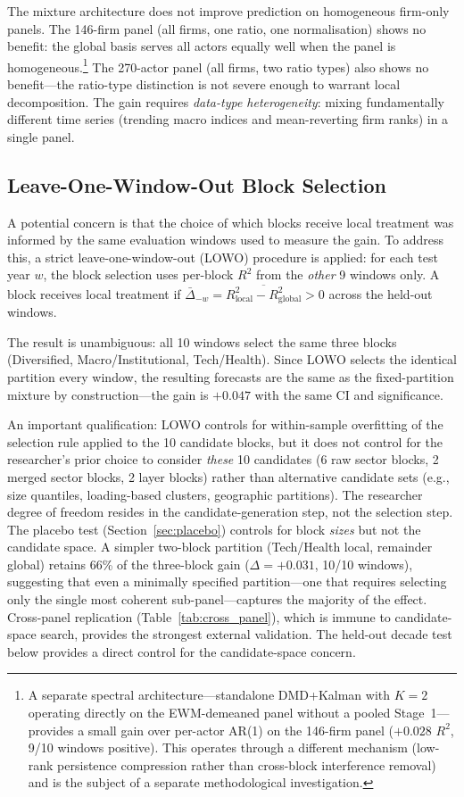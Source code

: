 \documentclass[11pt,a4paper]{article}
\begin{document}
The mixture architecture does not improve prediction on homogeneous firm-only panels. The 146-firm panel (all firms, one ratio, one normalisation) shows no benefit: the global basis serves all actors equally well when the panel is homogeneous.\footnote{A separate spectral architecture---standalone DMD+Kalman with $K{=}2$ operating directly on the EWM-demeaned panel without a pooled Stage~1---provides a small gain over per-actor AR(1) on the 146-firm panel ($+0.028$ $R^2$, 9/10 windows positive). This operates through a different mechanism (low-rank persistence compression rather than cross-block interference removal) and is the subject of a separate methodological investigation.} The 270-actor panel (all firms, two ratio types) also shows no benefit---the ratio-type distinction is not severe enough to warrant local decomposition. The gain requires \emph{data-type heterogeneity}: mixing fundamentally different time series (trending macro indices and mean-reverting firm ranks) in a single panel.

\subsection{Leave-One-Window-Out Block Selection}

A potential concern is that the choice of which blocks receive local treatment was informed by the same evaluation windows used to measure the gain. To address this, a strict leave-one-window-out (LOWO) procedure is applied: for each test year $w$, the block selection uses per-block $R^2$ from the \emph{other} 9 windows only. A block receives local treatment if $\bar\Delta_{-w} = \overline{R^2_{\text{local}} - R^2_{\text{global}}} > 0$ across the held-out windows.

The result is unambiguous: all 10 windows select the same three blocks (Diversified, Macro/Institutional, Tech/Health). Since LOWO selects the identical partition every window, the resulting forecasts are the same as the fixed-partition mixture by construction---the gain is $+0.047$ with the same CI and significance.

An important qualification: LOWO controls for within-sample overfitting of the selection rule applied to the 10 candidate blocks, but it does not control for the researcher's prior choice to consider \emph{these} 10 candidates (6 raw sector blocks, 2 merged sector blocks, 2 layer blocks) rather than alternative candidate sets (e.g., size quantiles, loading-based clusters, geographic partitions). The researcher degree of freedom resides in the candidate-generation step, not the selection step. The placebo test (Section~\ref{sec:placebo}) controls for block \emph{sizes} but not the candidate space. A simpler two-block partition (Tech/Health local, remainder global) retains 66\% of the three-block gain ($\Delta = +0.031$, 10/10 windows), suggesting that even a minimally specified partition---one that requires selecting only the single most coherent sub-panel---captures the majority of the effect. Cross-panel replication (Table~\ref{tab:cross_panel}), which is immune to candidate-space search, provides the strongest external validation. The held-out decade test below provides a direct control for the candidate-space concern.
\end{document}
